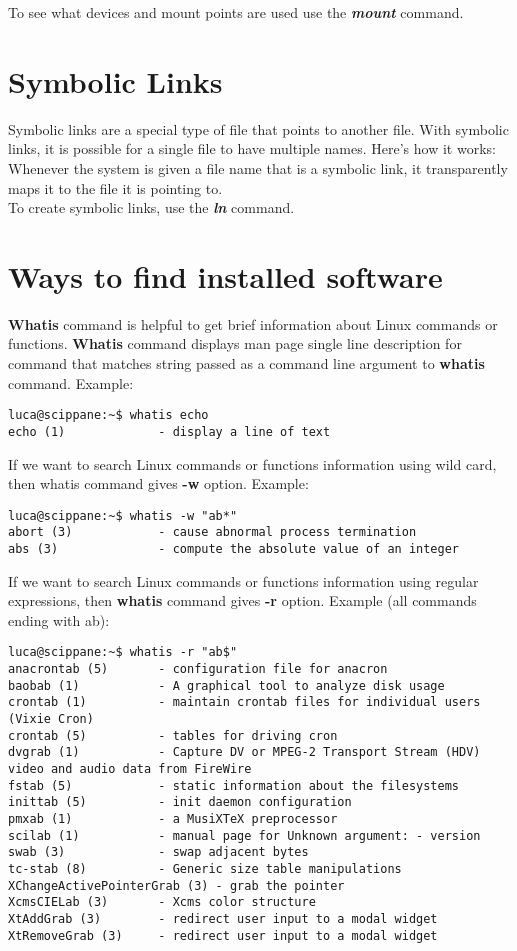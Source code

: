 \documentclass[10pt,letterpaper]{book}
\begin{document}
\begin{itemize}
To see what devices and mount points are used use the \textit{\textbf{mount}} command.
\end{itemize}
\section{Symbolic Links}
Symbolic links are a special type of file that points to another file. With symbolic links, it is possible for a single file to have multiple names. Here's how it works: Whenever the system is given a file name that is a symbolic link, it transparently maps it to the file it is pointing to.\\
To create symbolic links, use the \textit{\textbf{ln}} command.
\section{Ways to find installed software}
\textbf{Whatis} command is helpful to get brief information about Linux commands or functions. \textbf{Whatis} command displays man page single line description for command that matches string passed as a command line argument to \textbf{whatis} command. Example:
\begin{lstlisting}
luca@scippane:~$ whatis echo
echo (1)             - display a line of text
\end{lstlisting}
If we want to search Linux commands or functions information using wild card, then whatis command gives \textbf{-w} option. Example:
\begin{lstlisting}
luca@scippane:~$ whatis -w "ab*"
abort (3)            - cause abnormal process termination
abs (3)              - compute the absolute value of an integer
\end{lstlisting}
If we want to search Linux commands or functions information using regular expressions, then \textbf{whatis} command gives \textbf{-r} option. Example (all commands ending with ab):
\begin{lstlisting}
luca@scippane:~$ whatis -r "ab$"
anacrontab (5)       - configuration file for anacron
baobab (1)           - A graphical tool to analyze disk usage
crontab (1)          - maintain crontab files for individual users (Vixie Cron)
crontab (5)          - tables for driving cron
dvgrab (1)           - Capture DV or MPEG-2 Transport Stream (HDV) video and audio data from FireWire
fstab (5)            - static information about the filesystems
inittab (5)          - init daemon configuration
pmxab (1)            - a MusiXTeX preprocessor
scilab (1)           - manual page for Unknown argument: - version
swab (3)             - swap adjacent bytes
tc-stab (8)          - Generic size table manipulations
XChangeActivePointerGrab (3) - grab the pointer
XcmsCIELab (3)       - Xcms color structure
XtAddGrab (3)        - redirect user input to a modal widget
XtRemoveGrab (3)     - redirect user input to a modal widget
\end{lstlisting}
\end{document}
